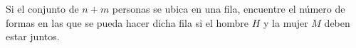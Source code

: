 Si el conjunto de \(n+m\) personas se ubica en una fila, encuentre el número de formas en las que se pueda hacer dicha fila si el hombre \(H\) y la mujer \(M\) deben estar juntos.
